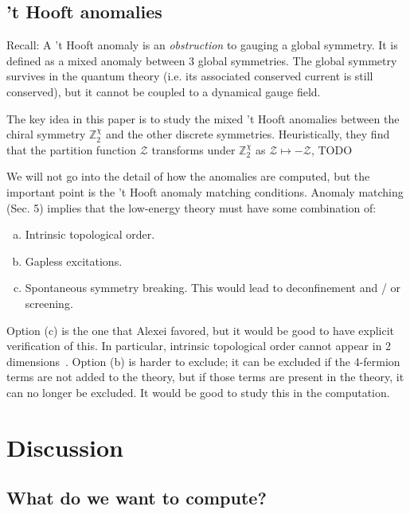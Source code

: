 \subsection{'t Hooft anomalies}

Recall: A 't Hooft anomaly is an \textit{obstruction} to gauging a global symmetry. It is defined as a mixed anomaly between 3 global symmetries. The global symmetry survives in the quantum theory (i.e. its associated conserved current is still conserved), but it cannot be coupled to a dynamical gauge field. 

The key idea in this paper is to study the mixed 't Hooft anomalies between the chiral symmetry $\mathbb Z_2^\chi$ and the other discrete symmetries. Heuristically, they find that the partition function $\mathcal Z$ transforms under $\mathbb Z_2^\chi$ as $\mathcal Z\mapsto -\mathcal Z$, TODO

We will not go into the detail of how the anomalies are computed, but the important point is the 't Hooft anomaly matching conditions. Anomaly matching (Sec. 5) implies that the low-energy theory must have some combination of:
\begin{enumerate}[a)]
	\item Intrinsic topological order.
	\item Gapless excitations.
	\item Spontaneous symmetry breaking. This would lead to deconfinement and / or screening.
\end{enumerate}
Option (c) is the one that Alexei favored, but it would be good to have explicit verification of this. In particular, intrinsic topological order cannot appear in 2 dimensions~\cite{Chen_2011}. Option (b) is harder to exclude; it can be excluded if the 4-fermion terms are not added to the theory, but if those terms are present in the theory, it can no longer be excluded. It would be good to study this in the computation. 

\section{Discussion}

\subsection{What do we want to compute?}

